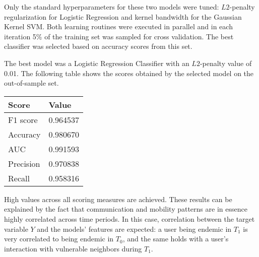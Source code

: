 Only the standard hyperparameters for these two models were tuned: $L2$-penalty regularization for Logistic Regression and kernel bandwidth for the Gaussian Kernel SVM.
Both learning routines were executed in parallel and in each iteration 5\% of the training set was sampled for cross validation. The best classifier was selected based on accuracy scores from this set.



The best model was a Logistic Regression Classifier with an $L2$-penalty value of 0.01. 
The following table
shows the scores obtained by the selected model on the out-of-sample set.

\begin{center}
\begin{tabular}{ l l }
\toprule
Score & Value \\
\midrule
F1 score  & 0.964537   \\
Accuracy  & 0.980670   \\
AUC       & 0.991593   \\
Precision & 0.970838   \\
Recall    & 0.958316   \\
\bottomrule
\end{tabular}
\end{center}



High values across all scoring measures are achieved. %
These results can be explained by the fact that 
communication and mobility patterns are in essence highly correlated across time periods. 
In this case, correlation between the target variable $Y$ and the models' features are expected:
a user being endemic in $T_1$ is very correlated to being endemic in $T_0$, and the same holds with a user's interaction with vulnerable neighbors during $T_1$.

